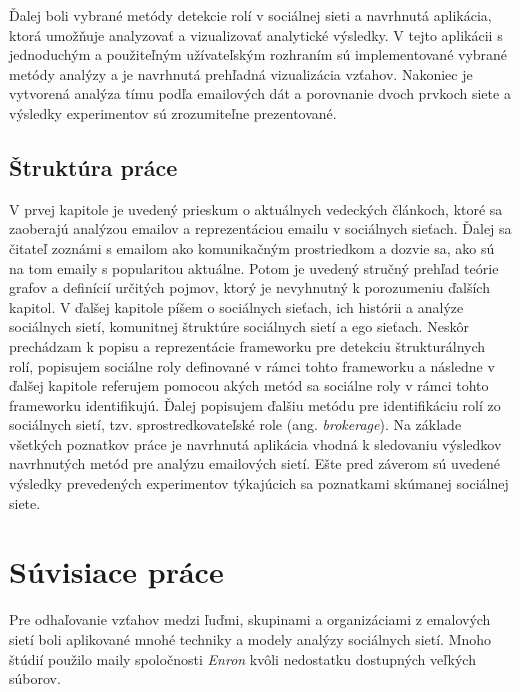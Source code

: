 \documentclass[slovak,master,public,dept460,male,cpdeclaration,oneside]{diploma}
\begin{document}
Ďalej boli vybrané metódy detekcie rolí v sociálnej sieti a navrhnutá aplikácia, ktorá umožňuje analyzovať a vizualizovať analytické výsledky. V tejto aplikácii s jednoduchým a použiteľným užívateľským rozhraním sú implementované vybrané metódy analýzy a je navrhnutá prehľadná vizualizácia vzťahov. Nakoniec je vytvorená analýza tímu podľa emailových dát a porovnanie dvoch prvkoch siete a výsledky experimentov sú zrozumiteľne prezentované.

\subsection{Štruktúra práce}
V prvej kapitole je uvedený prieskum o aktuálnych vedeckých článkoch, ktoré sa zaoberajú analýzou emailov a reprezentáciou emailu v sociálnych sieťach. Ďalej sa čitateľ zoznámi s emailom ako komunikačným prostriedkom a dozvie sa, ako sú na tom emaily s popularitou aktuálne. Potom je uvedený stručný prehľad teórie grafov a definícií určitých pojmov, ktorý je nevyhnutný k porozumeniu ďalších kapitol. V ďalšej kapitole píšem o sociálnych sieťach, ich histórii a analýze sociálnych sietí, komunitnej štruktúre sociálnych sietí a ego sieťach. Neskôr prechádzam k popisu a reprezentácie frameworku pre detekciu štrukturálnych rolí, popisujem sociálne roly definované v \newline rámci tohto frameworku a následne v ďalšej kapitole referujem pomocou akých metód sa sociálne roly v rámci tohto frameworku identifikujú. Ďalej popisujem ďalšiu metódu pre identifikáciu rolí zo sociálnych sietí, tzv. sprostredkovateľské role (ang. \textit{brokerage}). Na základe všetkých poznatkov práce je navrhnutá aplikácia vhodná k sledovaniu výsledkov navrhnutých metód pre analýzu emailových sietí.  Ešte pred záverom sú uvedené výsledky prevedených experimentov týkajúcich sa poznatkami skúmanej sociálnej siete.


\section{Súvisiace práce}

Pre odhaľovanie vzťahov medzi ľuďmi, skupinami a organizáciami z emalových sietí boli aplikované mnohé techniky a modely analýzy sociálnych sietí. Mnoho štúdií použilo maily spoločnosti \textit{Enron} kvôli nedostatku dostupných veľkých súborov. 
\end{document}
